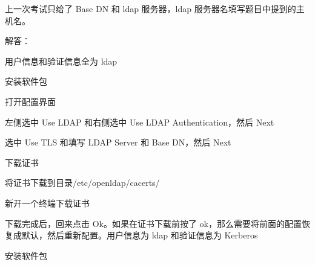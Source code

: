 \documentclass[letterpaper,10pt,english]{sphinxmanual}
\begin{document}
上一次考试只给了 Base DN 和 ldap 服务器，ldap 服务器名填写题目中提到的主机名。

解答：

用户信息和验证信息全为 ldap

安装软件包

%
\begin{sphinxVerbatim}[commandchars=\\\{\}]
\PYG{p}{[} \PYG{p}{]}
\end{sphinxVerbatim}

打开配置界面

%
\begin{sphinxVerbatim}[commandchars=\\\{\}]
\PYG{p}{[} \PYG{p}{]}
\end{sphinxVerbatim}

左侧选中 Use LDAP 和右侧选中 Use LDAP Authentication，然后 Next

选中 Use TLS 和填写 LDAP Server 和 Base DN，然后 Next

下载证书

将证书下载到目录/etc/openldap/cacerts/

新开一个终端下载证书

%
\begin{sphinxVerbatim}[commandchars=\\\{\}]
\PYG{p}{[} \PYG{p}{]}
\PYG{p}{[} \PYG{p}{]}
\end{sphinxVerbatim}

下载完成后，回来点击 Ok。如果在证书下载前按了 ok，那么需要将前面的配置恢复成默认，然后重新配置。用户信息为 ldap 和验证信息为 Kerberos

安装软件包

%
\begin{sphinxVerbatim}[commandchars=\\\{\}]
    
\end{sphinxVerbatim}
\end{document}

